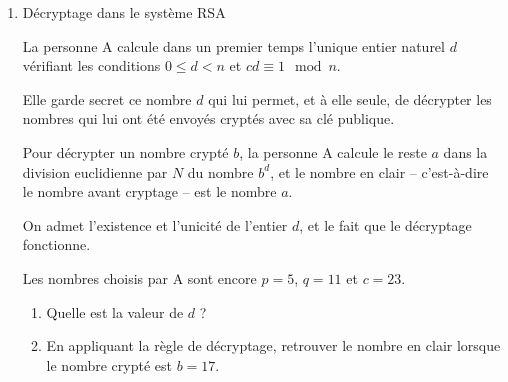 \documentclass{cornouaille}
\begin{document}
\begin{exercice}[Spécialité][5]
\begin{enumerate}
Une personne A choisit deux nombres premiers $p$ et $q$, puis calcule les produits $N = p q$ et
$n = (p - 1)(q - 1)$. Elle choisit également un entier naturel $c$ premier avec $n$.
	
La personne A publie le couple $(N~;~c)$, qui est une clé publique permettant à quiconque de lui
envoyer un nombre crypté.
	
Les messages sont numérisés et transformés en une suite d'entiers compris entre $0$ et $N -1$.
	
Pour crypter un entier $a$ de cette suite, on procède ainsi : on calcule le reste $b$ dans la division
euclidienne par $N$ du nombre $a^c$, et le nombre crypté est l'entier $b$.

\smallskip

Dans la pratique, cette méthode est sûre si la personne A choisit des nombres premiers $p$ et $q$
très grands, s'écrivant avec plusieurs dizaines de chiffres.

On va l'envisager ici avec des nombres plus simples : $p = 5$ et $q = 11$.

La personne A choisit également $c = 23$.
	\begin{enumerate}
		\item Calculer les nombres $N$ et $n$, puis justifier que la valeur de $c$ vérifie la condition voulue.
		\item  Un émetteur souhaite envoyer à la personne A le nombre $a = 8$.
		
Déterminer la valeur du nombre crypté $b$.
	\end{enumerate}
\item  Décryptage dans le système RSA

La personne A calcule dans un premier temps l'unique entier naturel $d$ vérifiant les conditions
$0 \leqslant d < n$ et $cd \equiv 1 \mod n$.

Elle garde secret ce nombre $d$ qui lui permet, et à elle seule, de
décrypter les nombres qui lui ont été envoyés cryptés avec sa clé publique.

Pour décrypter un nombre crypté $b$, la personne A calcule le reste $a$ dans la division euclidienne
par $N$ du nombre $b^d$, et le nombre en clair -- c'est-à-dire le nombre avant cryptage -- est le
nombre $a$.

On admet l'existence et l'unicité de l'entier $d$, et le fait que le décryptage fonctionne.

Les nombres choisis par A sont encore $p = 5$, $q = 11$ et $c = 23$.
	\begin{enumerate}
		\item Quelle est la valeur de $d$ ?
		\item En appliquant la règle de décryptage, retrouver le nombre en clair lorsque le nombre crypté
est $b = 17$.
	\end{enumerate}
\end{enumerate}
\end{exercice}
\newpage
\end{document}

